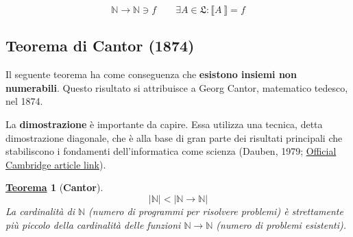 \documentclass[a4paper]{article}
\newtheorem{theorem}{\textcolor{Red3}{\underline{Teorema}}}
\newcommand{\exec}[1]{\llbracket #1\:\rrbracket}
\begin{document}
	\begin{equation*}
		\mathbb{N} \longrightarrow \mathbb{N} \ni f \hspace{2em}
		\exists A \in \mathfrak{L} : \exec{A} = f
	\end{equation*}
	
	\newpage
	
	\subsection{Teorema di Cantor (1874)}
	
	Il seguente teorema ha come conseguenza che \textbf{esistono insiemi non numerabili}. Questo risultato si attribuisce a Georg Cantor, matematico tedesco, nel 1874.
	
	La \textbf{dimostrazione} è importante da capire. Essa utilizza una tecnica, detta dimostrazione diagonale, che è alla base di gran parte dei risultati principali che stabiliscono i fondamenti dell'informatica come scienza (Dauben, 1979; \href{https://www.cambridge.org/core/journals/journal-of-symbolic-logic/article/abs/joseph-warren-dauben-georg-cantor-his-mathematics-and-philosophy-of-the-infinite-harvard-university-press-cambridge-mass-and-london-1979-ix-404-pp/52B6E0EDBF207D9023F9526866CDF92D}{Official Cambridge article link}).
	
	\begin{theorem}[\textbf{Cantor}] \label{cantor}
		\begin{equation}
			|\mathbb{N}| < |\mathbb{N} \longrightarrow \mathbb{N}|
		\end{equation}
		La cardinalità di $\mathbb{N}$ (numero di programmi per risolvere problemi) è strettamente più piccolo della cardinalità delle funzioni $\mathbb{N} \longrightarrow \mathbb{N}$ (numero di problemi esistenti).
	\end{theorem}
\end{document}
